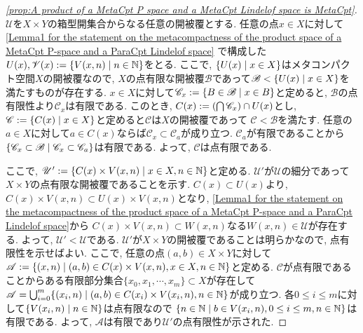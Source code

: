 \documentclass[uplatex, dvipdfmx, a4paper, 12pt, class=jsbook, crop=false]{standalone}
\begin{document}
\begin{proof}[\cref{prop:A product of a MetaCpt P space and a MetaCpt Lindelof space is MetaCpt}]
	$ \mathscr{U} $を$ X \times Y $の箱型開集合からなる任意の開被覆とする. 
	任意の点$ x \in X $に対して
	\cref{Lemma1 for the statement on the metacompactness of the product space of a MetaCpt P-space and a ParaCpt Lindelof space}
	で構成した$ U(x), \mathscr{V}(x) \defeq \setcomp{V(x, n)}{n \in \N} $をとる. 
	ここで, $ \setcomp{U(x)}{x \in X} $はメタコンパクト空間$ X $の開被覆なので, 
	$ X $の点有限な開被覆$ \mathscr{B} $であって$ \mathscr{B} < \setcomp{U(x)}{x \in X} $を満たすものが存在する. 
	$ x \in X $に対して$ \mathscr{C}_x \defeq \setcomp{B \in \mathscr{B}}{x \in B} $と定めると, 
	$ \mathscr{B} $の点有限性より$ \mathscr{C}_x $は有限である. 
	このとき, $ C(x) \mathrel{:=} \left(\bigcap \mathscr{C}_x \right) \cap U(x) $とし, 
	$ \mathscr{C} \defeq \setcomp{C(x)}{x \in X} $と定めると$ \mathscr{C} $は$ X $の開被覆であって
	$ \mathscr{C} < \mathscr{B} $を満たす. 
	任意の$ a \in X $に対して$ a \in C(x) $ならば$ \mathscr{C}_x \subset \mathscr{C}_a $が成り立つ. 
	$ \mathscr{C}_a $が有限であることから
	$ \setcomp{\mathscr{C}_x \subset \mathscr{B}}{\mathscr{C}_x \subset \mathscr{C}_a} $は有限である. 
	よって, $ \mathscr{C} $は点有限である. 

	ここで, $ \mathscr{U}' \defeq \setcomp{C(x) \times V(x, n)}{x \in X, n \in \N} $と定める. 
	$ \mathscr{U}' $が$ \mathscr{U} $の細分であって$ X \times Y $の点有限な開被覆であることを示す. 
	$ C(x) \subset U(x) $より, $ C(x) \times V(x, n) \subset U(x) \times V(x, n)$となり, 
	\cref{Lemma1 for the statement on the metacompactness of the product space of a MetaCpt P-space and a ParaCpt Lindelof space}から
	$ C(x) \times V(x, n) \subset W(x, n) $なる$ W(x, n) \in \mathscr{U} $が存在する. 
	よって, $ \mathscr{U}' < \mathscr{U} $である. 
	$ \mathscr{U}' $が$ X \times Y $の開被覆であることは明らかなので, 点有限性を示せばよい. 
	ここで, 任意の点$ (a, b) \in X \times Y $に対して
	$ \mathscr{A} \defeq \setcomp{(x, n)}{(a, b) \in C(x) \times V(x, n), x \in X, n \in \N} $と定める. 
	$ \mathscr{C} $が点有限であることからある有限部分集合$ \{x_0, x_1, \cdots, x_m\} \subset X $が存在して
	$ \mathscr{A} = \bigcup_{i=0}^{m} \setcomp{(x_i, n)}{(a, b) \in C(x_i) \times V(x_i, n), n \in \N} $が成り立つ. 
	各$ 0 \leq i \leq m$に対して$ \setcomp{V(x_i, n)}{n \in \N} $は点有限なので
	$ \setcomp{n \in \N}{b \in V(x_i, n), 0 \leq i \leq m, n \in \N} $は有限である. 
	よって, $ \mathscr{A} $は有限であり$ \mathscr{U}' $の点有限性が示された.
\end{proof}
\end{document}
